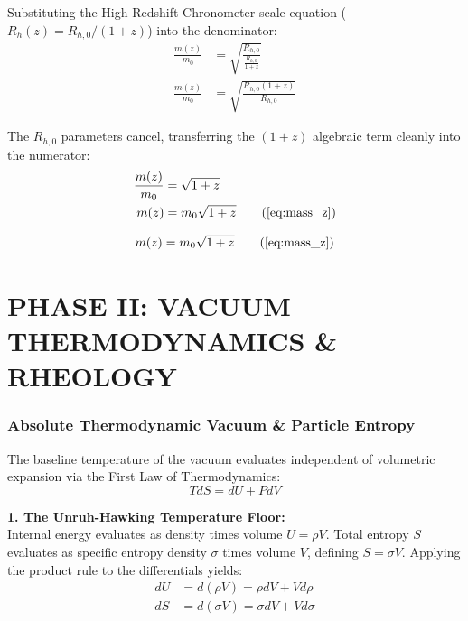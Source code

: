\documentclass[11pt, a4paper]{article}
\begin{document}
Substituting the High-Redshift Chronometer scale equation ($R_h(z) = R_{h,0} / (1+z)$) into the denominator:
\begin{align}
    \frac{m(z)}{m_0} &= \sqrt{ \frac{R_{h,0}}{ \frac{R_{h,0}}{1+z} } } \\
    \frac{m(z)}{m_0} &= \sqrt{ \frac{R_{h,0} (1+z)}{R_{h,0}} }
\end{align}

The $R_{h,0}$ parameters cancel, transferring the $(1+z)$ algebraic term cleanly into the numerator:
\begin{align}
    \frac{m(z)}{m_0} &= \sqrt{1+z} \\
    m(z) &= m_0 \sqrt{1+z} \tag{\ref{eq:mass_z}}
\end{align}

\begin{tcolorbox}[recallbox, title={\ref{box:mass_amplification}. Temporal Amplification of Mass}]
\begin{equation}
    m(z) = m_0 \sqrt{1+z} \tag{\ref{eq:mass_z}}
\end{equation}
\end{tcolorbox}





\part*{PHASE II: VACUUM THERMODYNAMICS \& RHEOLOGY}




\section{Absolute Thermodynamic Vacuum \& Particle Entropy}
\label{sec:deriv_thermo_vacuum}

The baseline temperature of the vacuum evaluates independent of volumetric expansion via the First Law of Thermodynamics: 
\begin{equation}
    T dS = dU + P dV \nonumber
\end{equation}

\textbf{1. The Unruh-Hawking Temperature Floor:} \\
Internal energy evaluates as density times volume $U = \rho V$. Total entropy $S$ evaluates as specific entropy density $\sigma$ times volume $V$, defining $S = \sigma V$. Applying the product rule to the differentials yields:
\begin{align}
    dU &= d(\rho V) = \rho dV + V d\rho  \\
    dS &= d(\sigma V) = \sigma dV + V d\sigma 
\end{align}
\end{document}
